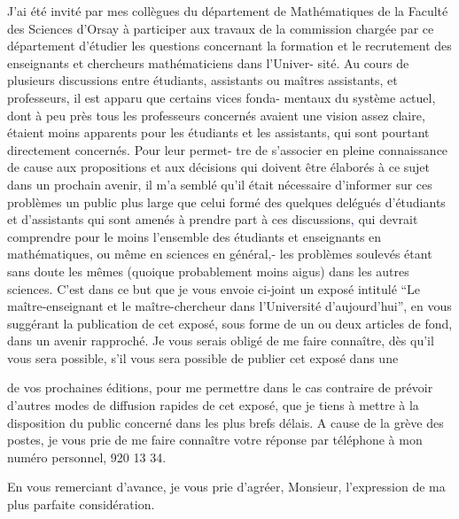 \documentclass[11pt]{article}
\newcommand{\scanpage}[1]{\par\bigskip\noindent{\small\sffamily[scan #1]}\par}
\newcommand{\mspage}[1]{{\small\sffamily[p.\,#1]}}
\newcommand{\hand}[1]{\textcolor{blue}{#1}}
\begin{document}
J'ai été invité par mes collègues du département de Mathématiques
de la Faculté des Sciences d'Orsay à participer aux travaux de la commission
chargée par ce département d'étudier les questions concernant la formation
et le recrutement des enseignants et chercheurs mathématiciens dans l'Univer-%
sité. Au cours de plusieurs discussions entre étudiants, assistants ou
maîtres assistants, et professeurs, il est apparu que certains vices fonda-%
mentaux du système actuel, dont à peu près tous les professeurs concernés
avaient une vision assez claire, étaient moins apparents pour les étudiants
et les assistants, qui sont pourtant directement concernés. Pour leur permet-%
tre de s'associer en pleine connaissance de cause aux propositions et aux
décisions qui doivent être élaborés à ce sujet dans un prochain avenir, il
m'a semblé qu'il était nécessaire d'informer sur ces problèmes un public
plus large que celui formé des quelques delégués d'étudiants et d'assistants
qui sont amenés à prendre part à ces discussions\hand{,} qui devrait comprendre pour
le moins l'ensemble des étudiants et enseignants en mathématiques, ou même
en sciences en général,- les problèmes soulevés étant sans doute les mêmes
(quoique probablement moins aigus) dans les autres sciences. C'est dans ce
but que je vous envoie ci-joint un exposé intitulé ``Le maître-enseignant et
le maître-chercheur dans l'Université d'aujourd'hui'', en vous suggérant la
publication de cet exposé, sous forme de un ou deux articles de fond, dans
un avenir rapproché. Je vous serais obligé de me faire connaître, dès qu'il
vous sera possible, s'il vous sera possible de publier cet exposé dans une

\mspage{251}

\clearpage
\scanpage{119/252}
de vos prochaines éditions, pour me permettre dans le cas contraire de
prévoir d'autres modes de diffusion rapides de cet exposé, que je tiens
à mettre à la disposition du public concerné dans les plus brefs délais.
A cause de la grève des postes, je vous prie de me faire connaître votre
réponse par téléphone à mon numéro personnel, 920 13 34.

En vous remerciant d'avance, je vous prie d'agréer, Monsieur,
l'expression de ma plus parfaite considération.
\end{document}
